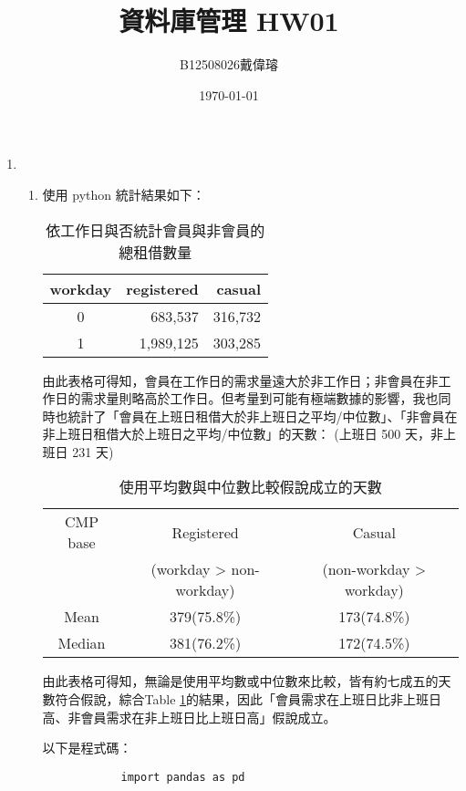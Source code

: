 \documentclass[12pt,a4paper]{article}
\title{資料庫管理 HW01}
\author{B12508026戴偉璿}
\date{\today}
\begin{document}
\maketitle

\newpage

\begin{enumerate}
    \item
    \begin{enumerate}
        \item 使用 python 統計結果如下：
        \begin{table}[H]
        \centering
        \begin{tabular}{c r r}
        \hline
        workday & registered & casual \\
        \hline
        0 & 683,537 & 316,732 \\
        1 & 1,989,125 & 303,285 \\
        \hline
        \end{tabular}
        \caption{依工作日與否統計會員與非會員的總租借數量}
        \label{tab:tab 1}
        \end{table}
        由此表格可得知，會員在工作日的需求量遠大於非工作日；非會員在非工作日的需求量則略高於工作日。但考量到可能有極端數據的影響，我也同時也統計了「會員在上班日租借大於非上班日之平均/中位數」、「非會員在非上班日租借大於上班日之平均/中位數」的天數： (上班日 500 天，非上班日 231 天)
        \begin{table}[H]
        \centering
        \begin{tabular}{c c c}
        \hline
        CMP base & Registered & Casual \\
        & (workday > non-workday) & (non-workday > workday) \\
        \hline
        Mean   & 379(75.8\%) & 173(74.8\%) \\
        Median & 381(76.2\%) & 172(74.5\%) \\
        \hline
        \end{tabular}
        \caption{使用平均數與中位數比較假說成立的天數}
        \end{table}
        由此表格可得知，無論是使用平均數或中位數來比較，皆有約七成五的天數符合假說，綜合Table \ref{tab:tab 1}的結果，因此「會員需求在上班日比非上班日高、非會員需求在非上班日比上班日高」假說成立。

        以下是程式碼：

        \begin{verbatim}
            import pandas as pd


\end{verbatim}
\end{enumerate}
\end{enumerate}
\end{document}

